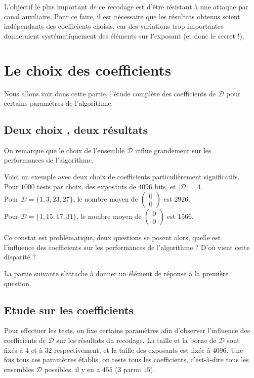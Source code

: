 \documentclass[12pt, a4paper]{memoir}
\newcommand{\doublezero}{\begin{pmatrix} 0 \\ 0 \end{pmatrix}}
\begin{document}
  L'objectif le plus important de ce recodage est d'être résistant à une attaque par canal auxiliaire. Pour ce 
  faire, il est nécessaire que les résultats obtenus soient indépendants des coefficients choisis, car des variations 
  trop importantes donneraient systématiquement des éléments sur l'exposant (et donc le secret !).
  
  \section{Le choix des coefficients}
  
  Nous allons voir dans cette partie, l'étude complète des coefficients de $\mathcal{D}$ pour certains paramètres
  de l'algorithme.
  
  \subsection{Deux choix , deux résultats}
  
  On remarque que le choix de l'ensemble $\mathcal{D}$ influe grandement sur les performances de l'algorithme.
  
  Voici un exemple avec deux choix de coefficients particulièrement significatifs. \\
  Pour $1000$ tests par choix, des exposants de $4096$ bits, et $|\mathcal{D}| = 4$. \\
  Pour $\mathcal{D} = \{1,3,23,27\}$, le nombre moyen de $\doublezero$ est $2926$. \\
  Pour $\mathcal{D} = \{1,15,17,31\}$, le nombre moyen de $\doublezero$ est $1566$.
  
  Ce constat est problèmatique, deux questions se posent alors, quelle est l'influence des coefficients sur 
  les performances de l'algorithme ? D'où vient cette disparité ?
  
  La partie suivante s'attache à donner un élément de réponse à la première question.
  
  \subsection{Etude sur les coefficients}
  
  Pour effectuer les tests, on fixe certains paramètres afin d'observer l'influence des coefficients
  de $\mathcal{D}$ sur les résultats du recodage. La taille et la borne de $\mathcal{D}$ sont fixés à $4$ et 
  à $32$ respectivement, et la taille des exposants est fixée à $4096$. Une fois tous ces paramètres établis, on
  teste tous les coefficients, c'est-à-dire tous les ensembles $\mathcal{D}$ possibles, 
  il y en a $455$ ($3$ parmi $15$).
  
\end{document}
